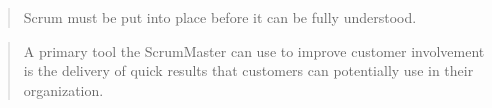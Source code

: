 \begin{quotation}
  Scrum must be put into place before it can be fully understood.
\end{quotation}


\begin{quotation}
  A primary tool the ScrumMaster can use to improve customer involvement is the delivery of quick results that customers can potentially use in their organization.
\end{quotation}



\begin{quotation}
  
\end{quotation}


\begin{quotation}
  
\end{quotation}


\begin{quotation}
  
\end{quotation}


\begin{quotation}
  
\end{quotation}


\begin{quotation}
  
\end{quotation}


\begin{quotation}
  
\end{quotation}


\begin{quotation}
  
\end{quotation}


\begin{quotation}
  
\end{quotation}


\begin{quotation}
  
\end{quotation}


\begin{quotation}
  
\end{quotation}



